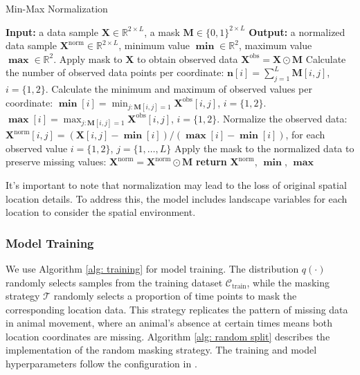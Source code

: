 \documentclass[11pt]{article}
\begin{document}
\begin{algorithm}
\caption{Min-Max Normalization}\label{alg: minmax_norm}
\begin{algorithmic}[1]
\State \textbf{Input:} a data sample $\bm{X}\in\mathbb{R}^{2\times L}$, a mask $\bm{M}\in \{0,1\}^{2\times L}$
\State \textbf{Output:} a normalized data sample $\bm{X}^{\mathrm{norm}}\in \mathbb{R}^{2\times L}$, minimum value $\bm{\min}\in \mathbb{R}^2$, maximum value $\bm{\max}\in \mathbb{R}^2$.
\State Apply mask to $\bm{X}$ to obtain observed data $\bm{X}^{\mathrm{obs}} = \bm{X} \odot \bm{M}$
\State Calculate the number of observed data points per coordinate: $\bm{n}[i]=\sum_{j=1}^L \bm{M}[i, j]$, $i=\{1,2\}$.
\State Calculate the minimum and maximum of observed values per coordinate:
\Statex $\bm{\min}[i]=\min_{j:\bm{M}[i,j]=1}\bm{X}^{\mathrm{obs}}[i,j]$, $i=\{1,2\}$.
\Statex $\bm{\max}[i]=\max_{j:\bm{M}[i,j]=1}\bm{X}^{\mathrm{obs}}[i,j]$, $i=\{1,2\}$.
\State Normalize the observed data: $\bm{X}^{\mathrm{norm}}[i,j] = (\bm{X}[i,j] - \bm{\min}[i]) / (\bm{\max}[i] - \bm{\min}[i])$, for each observed value $i=\{1,2\}$, $j=\{1, \ldots, L\}$
\State Apply the mask to the normalized data to preserve missing values: $\bm{X}^{\mathrm{norm}} = \bm{X}^{\mathrm{norm}} \odot \bm{M}$
\State \textbf{return} $\bm{X}^{\mathrm{norm}}$, $\bm{\min}$, $\bm{\max}$
\end{algorithmic}
\end{algorithm}

It's important to note that normalization may lead to the loss of original spatial location details. To address this, the model includes landscape variables for each location to consider the spatial environment.

\subsubsection{Model Training}
We use Algorithm \ref{alg: training} for model training. The distribution $q(\cdot)$ randomly selects samples from the training dataset $\mathcal{C}_{\mathrm{train}}$, while the masking strategy $\mathcal{T}$ randomly selects a proportion of time points to mask the corresponding location data. This strategy replicates the pattern of missing data in animal movement, where an animal's absence at certain times means both location coordinates are missing. Algorithm \ref{alg: random split} describes the implementation of the random masking strategy. The training and model hyperparameters follow the configuration in \citet{tashiro2021csdi}.
\end{document}
